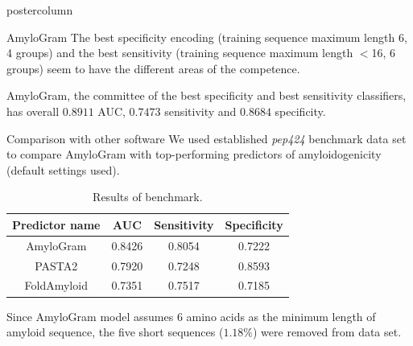\documentclass[final]{beamer}\usepackage[]{graphicx}\usepackage[]{color}
\begin{document}
\begin{frame}
\begin{columns}
\begin{column}{.51\textwidth}
\begin{beamercolorbox}[center,wd=\textwidth]{postercolumn}
\begin{minipage}[T]{.95\textwidth}
{%

\begin{block}{AmyloGram}
The best specificity encoding (training sequence maximum length 6, 4 groups) and the best sensitivity (training sequence maximum length $<$16, 6 groups) seem to have the different areas of the competence.

AmyloGram, the committee of the best specificity and best sensitivity classifiers, has overall $0.8911$ AUC, $0.7473$ sensitivity and $0.8684$ specificity.
\end{block}
\vfill

\begin{block}{Comparison with other software}
We used established \textit{pep424} benchmark data set~\citep{walsh_pasta_2014} to compare AmyloGram with top-performing  predictors of amyloidogenicity (default settings used).

\begin{table}[ht]
\centering
\caption{Results of benchmark.} 
\begin{tabular}{c|c|c|c}
  \toprule
Predictor name & AUC & Sensitivity & Specificity \\ 
  \midrule
AmyloGram & 0.8426 & 0.8054 & 0.7222 \\ 
   \rowcolor[gray]{0.75}PASTA2 & 0.7920 & 0.7248 & 0.8593 \\ 
  FoldAmyloid & 0.7351 & 0.7517 & 0.7185 \\ 
   \bottomrule
\end{tabular}
\end{table}


Since AmyloGram model assumes 6 amino acids as the minimum length of amyloid sequence, the five short sequences ($1.18\%$) were removed from data set.
\end{block}
\vfill

}
\end{minipage}
\end{beamercolorbox}
\end{column}
\end{columns}
\end{frame}
\end{document}
